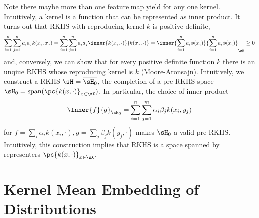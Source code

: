 \documentclass[11pt]{article}
\begin{document}
Note there maybe more than one feature map yield for any one kernel. Intuitively, a kernel is a function that can be represented as inner product. It turns out that RKHS with reproducing kernel $k$ is positive definite,
\begin{align}
    \sum_{i=1}^n \sum_{j=1}^n a_i a_j k(x_i,x_j)
        = \sum_{i=1}^n \sum_{j=1}^n a_i a_j \inner{k(x_i,\cdot)}{k(x_j,\cdot)}
        = \inner{\sum_{i=1}^n a_i \phi(x_i)}{\sum_{i=1}^n a_i \phi(x_i)}_{\sH}
        \geq 0
\end{align}
and, conversely, we can show that for every positive definite function $k$ there is an unqiue RKHS whose reproducing kernel is $k$ (Moore-Aronsajn). Intuitively, we construct a RKHS $\sH = \overline{\sH_0}$, the completion of a pre-RKHS space $\sH_0 = \text{span}(\pc{k(x,\cdot)}_{x\in\sX})$. In particular, the choice of inner product 
\begin{align}
    \inner{f}{g}_{\sH_0}
        = \sum_{i=1}^n\sum_{j=1}^m \alpha_i \beta_j k(x_i,y_j)
\end{align}
for $f = \sum_i \alpha_i k(x_i,\cdot), g = \sum_j \beta_j k(y_j,\cdot)$ makes $\sH_0$ a valid pre-RKHS. Intuitively, this construction implies that RKHS is a space spanned by representers $\pc{k(x,\cdot)}_{x\in\sX}$.


\section{Kernel Mean Embedding of Distributions}
\end{document}
